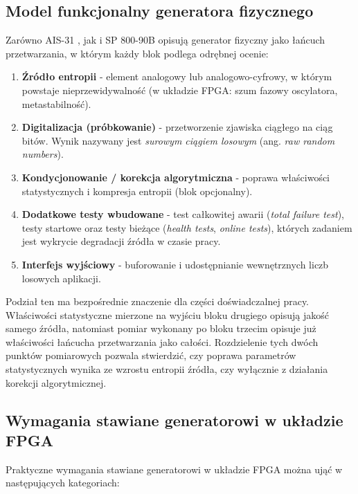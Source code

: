 \subsection{Model funkcjonalny generatora fizycznego}

Zarówno AIS-31 \cite{killmann2011ais31}, jak i SP 800-90B \cite{turan2018sp80090b}
opisują generator fizyczny jako łańcuch przetwarzania, w którym każdy blok
podlega odrębnej ocenie:

\begin{enumerate}
  \item \textbf{Źródło entropii} - element analogowy lub analogowo-cyfrowy,
        w którym powstaje nieprzewidywalność (w układzie FPGA: szum fazowy
        oscylatora, metastabilność).
  \item \textbf{Digitalizacja (próbkowanie)} - przetworzenie zjawiska
        ciągłego na ciąg bitów. Wynik nazywany jest \emph{surowym ciągiem
        losowym} (ang. \emph{raw random numbers}).
  \item \textbf{Kondycjonowanie / korekcja algorytmiczna} - poprawa
        właściwości statystycznych i kompresja entropii (blok opcjonalny).
  \item \textbf{Dodatkowe testy wbudowane} - test całkowitej awarii
        (\emph{total failure test}), testy startowe oraz testy bieżące
        (\emph{health tests}, \emph{online tests}), których zadaniem jest
        wykrycie degradacji źródła w czasie pracy.
  \item \textbf{Interfejs wyjściowy} - buforowanie i udostępnianie
        wewnętrznych liczb losowych aplikacji.
\end{enumerate}

Podział ten ma bezpośrednie znaczenie dla części doświadczalnej pracy.
Właściwości statystyczne mierzone na wyjściu bloku drugiego opisują jakość
samego źródła, natomiast pomiar wykonany po bloku trzecim opisuje już
właściwości łańcucha przetwarzania jako całości. Rozdzielenie tych dwóch
punktów pomiarowych pozwala stwierdzić, czy poprawa parametrów statystycznych
wynika ze wzrostu entropii źródła, czy wyłącznie z działania korekcji
algorytmicznej.

\subsection{Wymagania stawiane generatorowi w układzie FPGA}
\label{sec:wymagania}

Praktyczne wymagania stawiane generatorowi w układzie FPGA można ująć
w następujących kategoriach:

